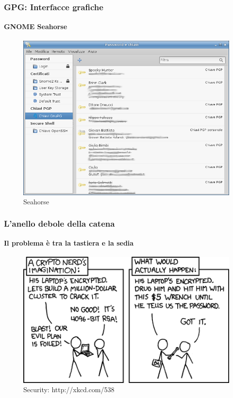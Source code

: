 \documentclass{beamer}
\begin{document}
\begin{frame}
  \frametitle{GPG: Interfacce grafiche}
  \framesubtitle{GNOME Seahorse}

  \begin{figure}
    \centering
    \includegraphics[width=.6\linewidth]{img/seahorse.png}
    \caption{Seahorse}
    \label{fig:seahorse0}
  \end{figure}
\end{frame}

\begin{frame}
  \frametitle{L'anello debole della catena}
  \framesubtitle{Il problema è tra la tastiera e la sedia}

  \begin{figure}
    \centering
    \includegraphics[width=.6\linewidth]{img/538.png}
    \caption{Security: http://xkcd.com/538}
    \label{fig:xkcd}
  \end{figure}

\end{frame}
\end{document}

